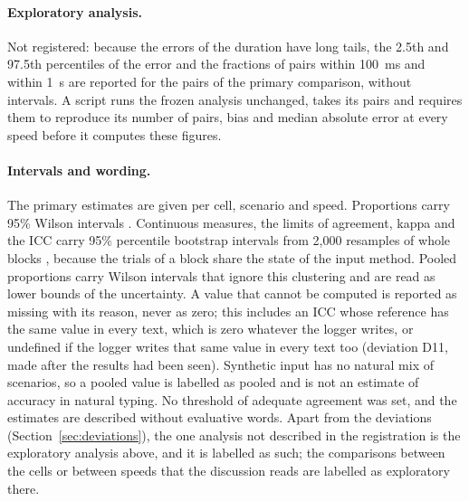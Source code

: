 \paragraph{Exploratory analysis.} Not registered: because the errors of the duration have long tails, the 2.5th and
97.5th percentiles of the error and the fractions of pairs within 100~ms and within 1~s are reported for the pairs of
the primary comparison, without intervals. A script runs the frozen analysis unchanged, takes its pairs and requires
them to reproduce its number of pairs, bias and median absolute error at every speed before it computes these figures.

\paragraph{Intervals and wording.} The primary estimates are given per cell, scenario and speed. Proportions carry
95\% Wilson intervals \citep{wilson1927}. Continuous measures, the limits of agreement, kappa and the ICC carry 95\%
percentile bootstrap intervals \citep{efron1979} from 2{,}000 resamples of whole blocks \citep{cameron2008}, because
the trials of a block share the state of the input method. Pooled proportions carry Wilson intervals that ignore this
clustering and are read as lower bounds of the uncertainty. A value that cannot be computed is reported as missing with
its reason, never as zero; this includes an ICC whose reference has the same value in every text, which is zero
whatever the logger writes, or undefined if the logger writes that same value in every text too (deviation D11, made
after the results had been seen). Synthetic input has no natural mix of scenarios, so a pooled value is labelled as
pooled and is not an estimate of accuracy in natural typing. No threshold of adequate agreement was set,
and the estimates are described without evaluative words. Apart from the deviations (Section~\ref{sec:deviations}),
the one analysis not described in the registration is the exploratory analysis above, and it is labelled as such; the
comparisons between the cells or between speeds that the discussion reads are labelled as exploratory there.

